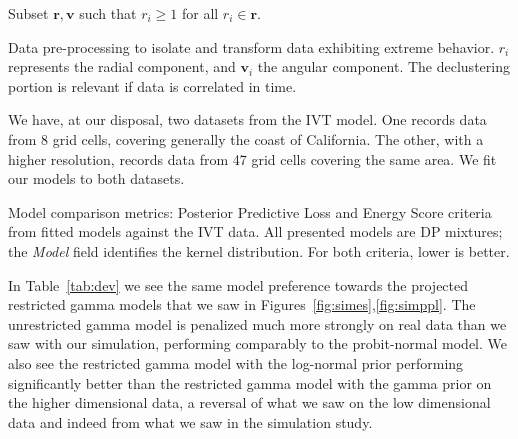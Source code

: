 \begin{algorithm}
  \label{algo:processing}
  Subset $\bm{ r},\bm{ v}$ such that $r_i \geq 1$ for all $r_i\in \bm{r}$.\\
 \caption{Data pre-processing to isolate and transform data exhibiting extreme behavior.  $r_i$ represents the radial component, 
    and $\bm{v}_i$ the angular component.  The declustering portion is relevant if data is correlated in time.}
\end{algorithm}

We have, at our disposal, two datasets from the IVT model.   One records data from 8 grid cells, covering
  generally the coast of California.  The other, with a higher resolution, records data from 47 grid
  cells covering the same area.  We fit our models to both datasets.

\begin{table}[hb]
  \label{tab:dev}
  \centering
  
  \caption{Model comparison metrics: Posterior Predictive Loss and Energy Score criteria from fitted
    models against the IVT data.  All presented models are DP mixtures; the \emph{Model} field
    identifies the kernel distribution.  For both criteria, lower is better.}
\end{table}

In Table~\ref{tab:dev} we see the same model preference towards the projected restricted gamma models
  that we saw in Figures~\ref{fig:simes},\ref{fig:simppl}.  The unrestricted gamma model is penalized much
  more strongly on real data than we saw with our simulation, performing comparably to the probit-normal
  model.  We also see the restricted gamma model with the log-normal prior performing significantly
  better than the restricted gamma model with the gamma prior on the higher dimensional data, a reversal
  of what we saw on the low dimensional data and indeed from what we saw in the simulation study.

